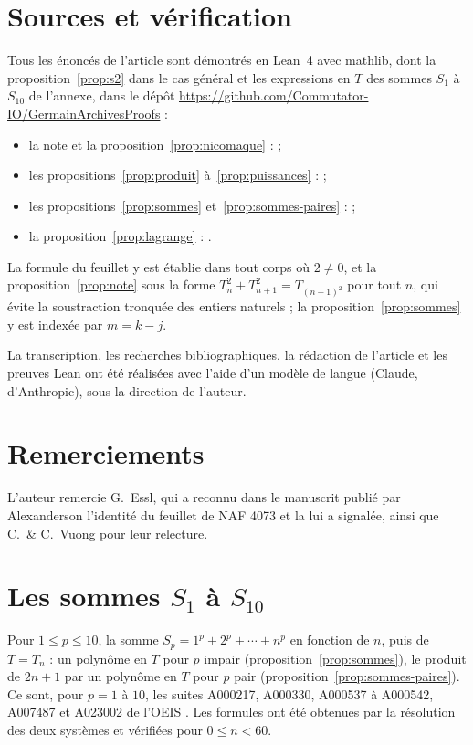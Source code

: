 \documentclass[11pt,a4paper]{article}
\theoremstyle{remark}
\begin{document}
\section*{Sources et vérification}

Tous les énoncés de l'article sont démontrés en Lean~4 avec mathlib, dont la
proposition~\ref{prop:s2} dans le cas général et les expressions en $T$ des
sommes $S_1$ à $S_{10}$ de l'annexe, dans le dépôt \url{https://github.com/Commutator-IO/GermainArchivesProofs} :
\begin{itemize}
\item la note et la proposition~\ref{prop:nicomaque} :
   ;
\item les propositions~\ref{prop:produit} à~\ref{prop:puissances} :
   ;
\item les propositions~\ref{prop:sommes} et~\ref{prop:sommes-paires} :
   ;
\item la proposition~\ref{prop:lagrange} :
  .
\end{itemize}
La formule du feuillet y est établie dans tout corps où $2 \neq 0$, et la
proposition~\ref{prop:note} sous la forme $T_n^2 + T_{n+1}^2 = T_{(n+1)^2}$
pour tout $n$, qui évite la soustraction tronquée des entiers naturels ; la
proposition~\ref{prop:sommes} y est indexée par $m = k - j$.

La transcription, les recherches bibliographiques, la rédaction de l'article
et les preuves Lean ont été réalisées avec l'aide d'un modèle de langue
(Claude, d'Anthropic), sous la direction de l'auteur.

\section*{Remerciements}

L'auteur remercie G.~Essl, qui a reconnu dans le manuscrit publié par
Alexanderson l'identité du feuillet de NAF 4073 et la lui a signalée, ainsi
que C.~\& C.~Vuong pour leur relecture.

\appendix

\section{Les sommes $S_1$ à $S_{10}$}\label{sec:annexe}

Pour $1 \leq p \leq 10$, la somme $S_p = 1^p + 2^p + \cdots + n^p$ en fonction
de $n$, puis de $T = T_n$ : un polynôme en $T$ pour $p$ impair
(proposition~\ref{prop:sommes}), le produit de $2n + 1$ par un polynôme en
$T$ pour $p$ pair (proposition~\ref{prop:sommes-paires}). Ce sont, pour
$p = 1$ à $10$, les suites A000217, A000330, A000537 à A000542, A007487 et
A023002 de l'OEIS \cite{oeis}. Les formules ont
été obtenues par la résolution des deux systèmes et vérifiées pour
$0 \leq n < 60$.
\end{document}
